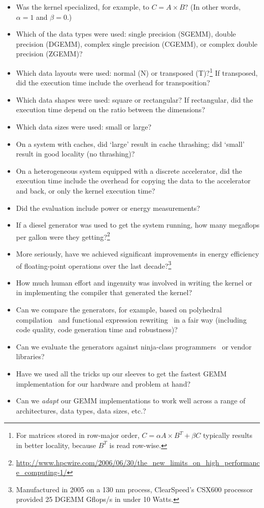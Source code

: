 \documentclass{acm_proc_article-sp} %
\begin{document}
\begin{itemize}
%
\item Was the kernel specialized, for example, to $C = A \times B$? (In other
words, $\alpha=1$ and $\beta=0$.)
%
\item Which of the data types were used: single precision (SGEMM), double
precision (DGEMM), complex single precision (CGEMM), or complex double
precision (ZGEMM)?
%
\item Which data layouts were used: normal (N) or transposed (T)?\footnote{For
matrices stored in row-major order, $C = \alpha A \times B^{T} + \beta C$
typically results in better locality, because $B^{T}$ is read row-wise.} If
transposed, did the execution time include the overhead for transposition?
%
\item Which data shapes were used: square or rectangular? If rectangular, did
the execution time depend on the ratio between the dimensions?
%
\item Which data sizes were used: small or large?
%
\item On a system with caches, did `large' result in cache thrashing; did
`small' result in good locality (no thrashing)?
%
\item On a heterogeneous system equipped with a discrete accelerator, did the
execution time include the overhead for copying the data to the accelerator and
back, or only the kernel execution time?
%
\item Did the evaluation include power or energy measurements?
%
\item If a diesel generator was used to get the system running, how many
megaflops per gallon were they
getting?\footnote{\url{http://www.hpcwire.com/2006/06/30/the_new_limits_on_high_performance_computing-1/}}
%
\item More seriously, have we achieved significant improvements in energy
efficiency of floating-point operations over the last
decade?\footnote{Manufactured in 2005 on a 130 nm process, ClearSpeed's CSX600
processor provided 25 DGEMM Gflops/s in under 10 Watts.}
%
\item How much human effort and ingenuity was involved in writing the kernel or
in implementing the compiler that generated the kernel?
%
\item Can we compare the generators, for example, based on polyhedral
compilation~\cite{Beaugnon:2014} and functional expression
rewriting~\cite{Steuwer:2015} in a fair way (including code quality, code
generation time and robustness)?
%
\item Can we evaluate the generators against ninja-class
programmers~\cite{Goto:2008} or vendor libraries?
%
\item Have we used all the tricks up our sleeves to get the fastest GEMM
implementation for our hardware and problem at hand?
%
\item Can we {\em adapt} our GEMM implementations to work well across a range
of architectures, data types, data sizes, etc.?
%
\end{itemize}
\end{document}
